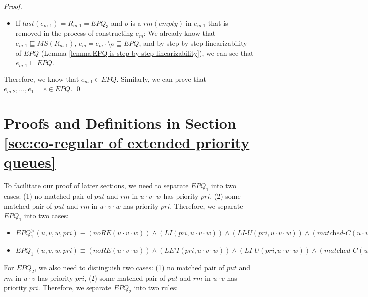 \begin {proof}
\begin{itemize}
\item[-] If $\textit{last}(e_{\textit{m-1}}) = R_{\textit{m-1}} = \textit{EPQ}_3$ and $o$ is a $\textit{rm}(\textit{empty})$ in $e_{\textit{m-1}}$ that is removed in the process of constructing $e_m$: We already know that $e_{\textit{m-1}} \sqsubseteq \textit{MS}(R_{\textit{m-1}})$, $e_m = e_{\textit{m-1}} \setminus o \sqsubseteq \textit{EPQ}$, and by step-by-step linearizability of $\textit{EPQ}$ (Lemma \ref{lemma:EPQ is step-by-step linearizability}), we can see that $e_{\textit{m-1}} \sqsubseteq \textit{EPQ}$.
\end{itemize}

Therefore, we know that $e_{\textit{m-1}} \in \textit{EPQ}$. Similarly, we can prove that $e_{\textit{m-2}},\ldots,e_1 = e \in \textit{EPQ}$. \qed
\end {proof}


\section{Proofs and Definitions in Section \ref{sec:co-regular of extended priority queues}}
\label{sec:appendix proof and definition in section co-regular of extended priority queues}

To facilitate our proof of latter sections, we need to separate $\textit{EPQ}_1$ into two cases: (1) no matched pair of $\textit{put}$ and $\textit{rm}$ in $u \cdot v \cdot w$ has priority $\textit{pri}$, (2) some matched pair of $\textit{put}$ and $\textit{rm}$ in $u \cdot v \cdot w$ has priority $\textit{pri}$.  Therefore, we separate $\textit{EPQ}_1$ into two cases:

\begin{itemize}
\setlength{\itemsep}{0.5pt}
\item[-] $\textit{EPQ}_1^{>}(u,v,w,\textit{pri}) \equiv
(\textit{noRE}(u \cdot v \cdot w)) \wedge
(\textit{LI}(\textit{pri}, u \cdot v \cdot w)) \wedge
(\textit{LI-U}(\textit{pri},u \cdot v \cdot w)) \wedge
(\textit{matched-C}(u \cdot v,\textit{pri}) )$


\item[-] $\textit{EPQ}_1^{=}(u,v,w,\textit{pri}) \equiv
(\textit{noRE}(u \cdot v \cdot w)) \wedge
(\textit{LE'I}(\textit{pri}, u \cdot v \cdot w)) \wedge
(\textit{LI-U}(\textit{pri},u \cdot v \cdot w)) \wedge
(\textit{matched-C}(u \cdot v,\textit{pri}) ) \wedge
(\textit{putInSeq}(u \cdot v \cdot w,u,\textit{pri}))$
\end{itemize}


For $\textit{EPQ}_2$, we also need to distinguish two cases: (1) no matched pair of $\textit{put}$ and $\textit{rm}$ in $u \cdot v$ has priority $\textit{pri}$, (2) some matched pair of $\textit{put}$ and $\textit{rm}$ in $u \cdot v$ has priority $\textit{pri}$. Therefore, we separate $\textit{EPQ}_2$ into two rules:

